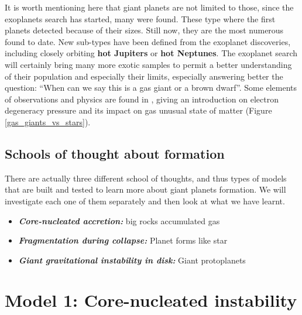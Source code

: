 \documentclass[12pt]{article} %
\begin{document}
It is worth mentioning here that giant planets are not limited to those, since the exoplanets search has started, many were found. These type where the first planets detected because of their sizes. Still now, they are the most numerous found to date. New sub-types have been defined from the exoplanet discoveries, including closely orbiting \textbf{hot Jupiters} or \textbf{hot Neptunes}. \newline\linebreak
\clearpage
\noindent The exoplanet search will certainly bring many more exotic samples to permit a better understanding of their population and especially their limits, especially answering better the question: ``When can we say this is a gas giant or a brown dwarf''. Some elements of observations and physics are found in \cite{Jeffries:2015:Online}, giving an introduction on electron degeneracy pressure and its impact on gas unusual state of matter (Figure \ref{gas_giants_vs_stars}).

\subsection{Schools of thought about formation}\vspace{-1ex}\bigskip

There are actually three different school of thoughts, and thus types of models that are built and tested to learn more about giant planets formation. We will investigate each one of them separately and then look at what we have learnt.

\begin{itemize}
\setlength\itemsep{0em}  
\item \textit{\textbf{Core-nucleated accretion:}} big rocks accumulated gas 
\item \textit{\textbf{Fragmentation during collapse:}} Planet forms like star
\item \textit{\textbf{Giant gravitational instability in disk:}} Giant protoplanets 
\end{itemize}


\section{Model 1: Core-nucleated instability}\vspace{-2ex}\titlerule[1pt]\bigskip
\end{document}
